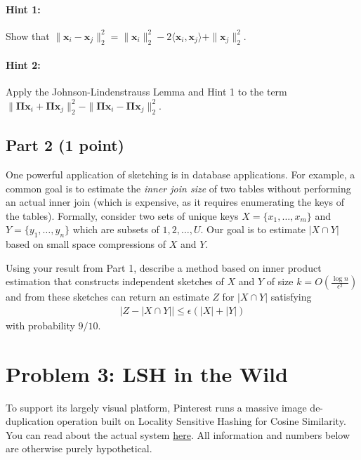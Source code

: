 \documentclass{article}
\begin{document}
\paragraph{Hint 1:} Show that $\| \mathbf{x}_i - \mathbf{x}_j \|_2^2 = \| \mathbf{x}_i \|_2^2 - 2 \langle \mathbf{x}_i, \mathbf{x}_j \rangle + \| \mathbf{x}_j \|_2^2$.

\paragraph{Hint 2:} Apply the Johnson-Lindenstrauss Lemma and Hint 1 to the term $\| \mathbf{\Pi x}_i + \mathbf{\Pi x}_j \|_2^2 - \| \mathbf{\Pi x}_i - \mathbf{\Pi x}_j \|_2^2$.

\subsection*{Part 2 (1 point)}
One powerful application of sketching is in database applications. For example, a common goal is to estimate the \emph{inner join size} of two tables without performing an actual inner join (which is expensive, as it requires enumerating the keys of the tables).
Formally, consider two sets of unique keys $X = \{x_1, \ldots, x_m\}$ and $Y = \{y_1, \ldots, y_n\}$ which are subsets of $1,2, \ldots, U$. 
Our goal is to estimate $|X\cap Y|$ based on small space compressions of $X$ and $Y$.  

Using your result from Part 1, describe a method based on inner product estimation that constructs independent sketches of $X$ and $Y$ of size  $k = O\left(\frac{\log n}{\epsilon^2}\right)$ and from these sketches can return an estimate $Z$ for $|X\cap Y|$ satisfying
\begin{align*}
	\left|Z - |X\cap Y|\right| \leq \epsilon (|X|+|Y|)
\end{align*}
with probability $9/10$.

%

\newpage

\section*{Problem 3: LSH in the Wild}

To support its largely visual platform, Pinterest runs a massive image de-duplication operation built on Locality Sensitive Hashing for Cosine Similarity. You can read about the actual system \href{https://medium.com/pinterest-engineering/detecting-image-similarity-using-spark-lsh-and-tensorflow-618636afc939}{here}.
All information and numbers below are otherwise purely hypothetical.
\end{document}
